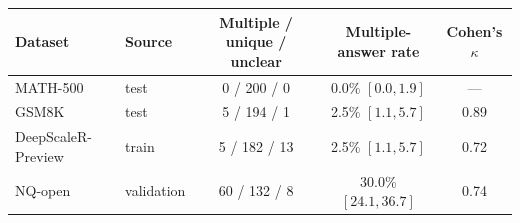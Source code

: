 \begin{tabular}{llccc}
\toprule
Dataset & Source & Multiple / unique / unclear & Multiple-answer rate & Cohen's $\kappa$ \\
\midrule
MATH-500 & test & 0 / 200 / 0 & 0.0\% {\scriptsize$[0.0,1.9]$} & --- \\
GSM8K & test & 5 / 194 / 1 & 2.5\% {\scriptsize$[1.1,5.7]$} & 0.89 \\
DeepScaleR-Preview & train & 5 / 182 / 13 & 2.5\% {\scriptsize$[1.1,5.7]$} & 0.72 \\
NQ-open & validation & 60 / 132 / 8 & 30.0\% {\scriptsize$[24.1,36.7]$} & 0.74 \\
\bottomrule
\end{tabular}

